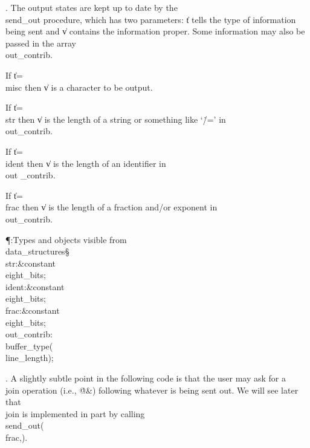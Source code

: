 . The output states are kept up to date by the \\{send\_out} procedure,
which
has two parameters: \|t tells the type of information being sent and
\|v contains the information proper. Some information may also be passed
in the array \\{out\_contrib}.

\yskip\hang If \|t\?=\?\\{misc} then \|v is a character to be output.

\hang If \|t\?=\?\\{str} then \|v is the length of a string or something like
`\.{/=}' in \\{out\_contrib}.

\hang If \|t\?=\?\\{ident} then \|v is the length of an identifier in \\{out%
\_contrib}.

\hang If \|t\?=\?\\{frac} then \|v is the length of a fraction and/or exponent
in
\\{out\_contrib}.

\Y\P\?\4:Types and objects visible from \\{data\_structures}\X\mathrel{+}\S%
\?\6
\\{str}\?:\?\&{constant}\8\\{eight\_bits}\?\K{};\6
\\{ident}\?:\?\&{constant}\8\\{eight\_bits}\?\K{};\6
\\{frac}\?:\?\&{constant}\8\\{eight\_bits}\?\K{};\7
\\{out\_contrib}\?:\?\\{buffer\_type}\?\1(\?\to\?\\{line\_length}\?\2)\?;%
\par
\fi

. A slightly subtle point in the following code is that the user may ask
for a \\{join} operation (i.e., \.{@\&}) following whatever is being sent
out.  We will see later that \\{join} is implemented in part by calling
\\{send\_out}\?(\?\\{frac}\?,\?)\?.

